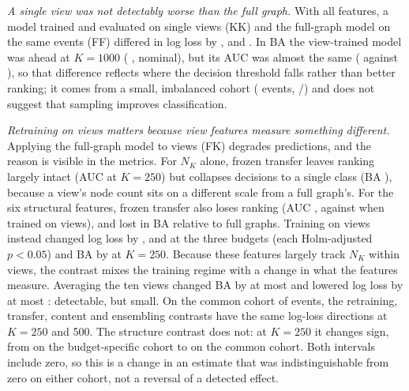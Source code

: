 \documentclass[conference]{IEEEtran}
\newcommand{\NK}{N_K}
\begin{document}
\emph{A single view was not detectably worse than the full graph.} With all features, a model trained and evaluated on single views (KK) and the full-graph model on the same events (FF) differed in log loss by \RViewFullLLTwoFifty{} \RViewFullLLCITwoFifty, \RViewFullLLFiveHundred{} \RViewFullLLCIFiveHundred{} and \RViewFullLLThousand{} \RViewFullLLCIThousand. In BA the view-trained model was ahead at $K=1000$ (\RViewMinusFullThousand{} \RViewMinusFullThousandCI, nominal), but its AUC was almost the same (\RKKAllAUCThousand{} against \RFFAllAUCThousand), so that difference reflects where the decision threshold falls rather than better ranking; it comes from a small, imbalanced cohort (\REligThousand{} events, \REligThousandCamp/\REligThousandComp) and does not suggest that sampling improves classification.

\emph{Retraining on views matters because view features measure something different.} Applying the full-graph model to views (FK) degrades predictions, and the reason is visible in the metrics. For $\NK$ alone, frozen transfer leaves ranking largely intact (AUC \RFKNKAUCTwoFifty{} at $K=250$) but collapses decisions to a single class (BA \RFKNKBATwoFifty), because a view's node count sits on a different scale from a full graph's. For the six structural features, frozen transfer also loses ranking (AUC \RFKStructAUCTwoFifty, against \RKKStructAUCTwoFifty{} when trained on views), and lost \RTransferLossTwoFifty{} in BA relative to full graphs. Training on views instead changed log loss by \RRetrainSLLTwoFifty, \RRetrainSLLFiveHundred{} and \RRetrainSLLThousand{} at the three budgets (each Holm-adjusted $p<0.05$) and BA by \RRetrainTwoFifty{} \RRetrainTwoFiftyCI{} at $K=250$. Because these features largely track $\NK$ within views, the contrast mixes the training regime with a change in what the features measure. Averaging the ten views changed BA by at most \REnsembleMax{} and lowered log loss by at most \REnsembleLLMax: detectable, but small. On the common cohort of \RCommonN{} events, the retraining, transfer, content and ensembling contrasts have the same log-loss directions at $K=250$ and 500. The structure contrast does not: at $K=250$ it changes sign, from \RStructNKLLTwoFifty{} \RStructNKLLCITwoFifty{} on the budget-specific cohort to \RCommonStructLL{} \RCommonStructLLCI{} on the common cohort. Both intervals include zero, so this is a change in an estimate that was indistinguishable from zero on either cohort, not a reversal of a detected effect.
\end{document}
